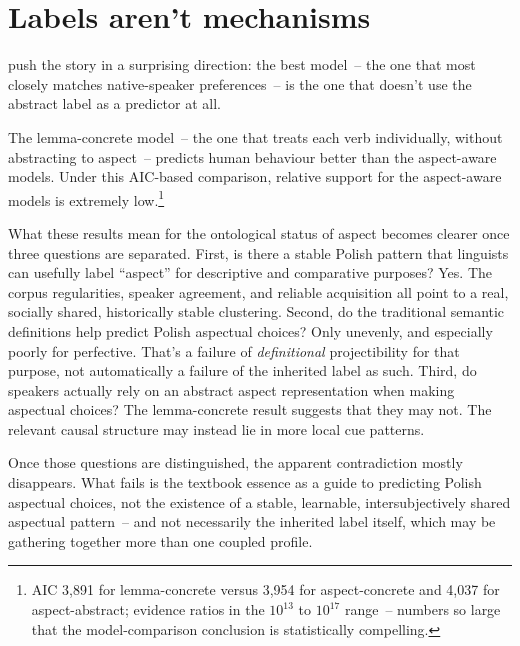 \section{Labels aren't mechanisms}
\label{sec:7:labels-mechanisms}

\textcite{divjak2025learnability} push the story in a surprising direction: the best model~-- the one that most closely matches native-speaker preferences~-- is the one that doesn't use the abstract  label as a predictor at all.

The lemma-concrete model~-- the one that treats each verb individually, without abstracting to aspect~-- predicts human behaviour better than the aspect-aware models. Under this AIC-based comparison, relative support for the aspect-aware models is extremely low.\footnote{AIC 3,891 for lemma-concrete versus 3,954 for aspect-concrete and 4,037 for aspect-abstract; evidence ratios in the $10^{13}$ to $10^{17}$ range~-- numbers so large that the model-comparison conclusion is statistically compelling.}

What these results mean for the ontological status of aspect becomes clearer once three questions are separated. First, is there a stable Polish pattern that linguists can usefully label \enquote{aspect} for descriptive and comparative purposes? Yes. The corpus regularities, speaker agreement, and reliable acquisition all point to a real, socially shared, historically stable clustering. Second, do the traditional semantic definitions help predict Polish aspectual choices? Only unevenly, and especially poorly for perfective. That's a failure of \emph{definitional} projectibility for that purpose, not automatically a failure of the inherited label as such. Third, do speakers actually rely on an abstract aspect representation when making aspectual choices? The lemma-concrete result suggests that they may not. The relevant causal structure may instead lie in more local cue patterns.

Once those questions are distinguished, the apparent contradiction mostly disappears. What fails is the textbook essence as a guide to predicting Polish aspectual choices, not the existence of a stable, learnable, intersubjectively shared aspectual pattern~-- and not necessarily the inherited label itself, which may be gathering together more than one coupled profile.

